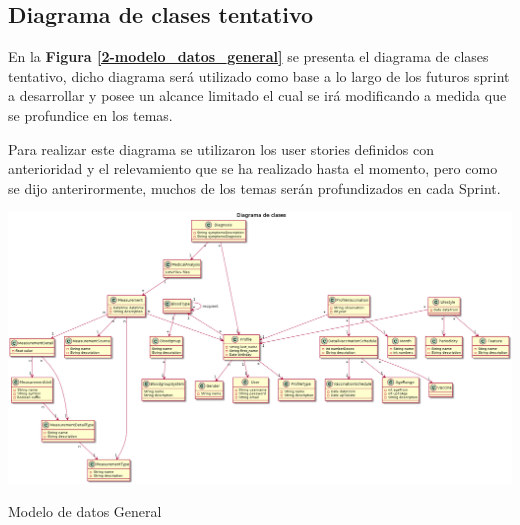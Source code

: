 \subsection{Diagrama de clases tentativo}
{\correccionTexto
En la \textbf{Figura \ref{2-modelo_datos_general}} se presenta el diagrama de clases tentativo, dicho diagrama  será utilizado como base a lo largo de los futuros sprint a desarrollar y posee un alcance limitado el cual se irá modificando a medida que se profundice en los temas.

Para realizar este diagrama se utilizaron los user stories definidos con anterioridad y el relevamiento que se ha realizado hasta el momento, pero como se dijo anterirormente, muchos de los temas serán profundizados en cada Sprint.
}

\begin{correccionSidewaysFigure}
  \centering
  \includegraphics[width=0.9 \textwidth]{img/tp1_parte2/0-DiagramaClasesGeneral}
  \caption{Modelo de datos General}
  \label{2-modelo_datos_general}
\end{correccionSidewaysFigure}


\clearpage %